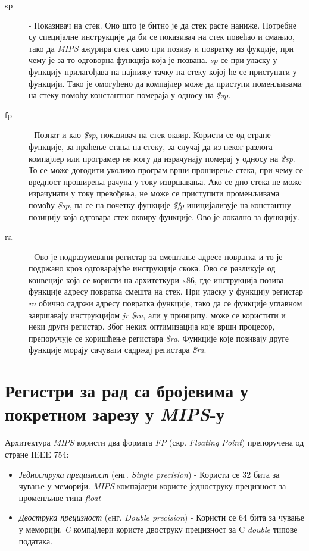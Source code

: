 \documentclass[12pt,oneside]{memoir}
\begin{document}
\begin{description}
  \item[sp] - Показивач на стек. Оно што је битно је да стек расте наниже. Потребне су специјалне инструкције да би се показивач на стек повећао и смањио, тако да \textit{MIPS} ажурира стек само при позиву и повратку из фукције, при чему је за то одговорна функција која је позвана. \textit{sp} се при уласку у функцију прилагођава на најнижу тачку на стеку којој ће се приступати у функцији. Тако је омогућено да компајлер може да приступи поменљивама на стеку помоћу константног помераја у односу на \textit{\$sp}.
  \item[fp] - Познат и као \textit{\$sp}, показивач на стек оквир. Користи се од стране функције, за праћење стања на стеку, за случај да из неког разлога компајлер или програмер не могу да израчунају померај у односу на \textit{\$sp}. То се може догодити уколико програм врши проширење стека, при чему се вредност проширења рачуна у току извршавања. Ако се дно стека не може израчунати у току превођења, не може се приступити променљивама помоћу \textit{\$sp}, па се на почетку функције \textit{\$fp} иницијализује на константну позицију која одговара стек оквиру функције. Ово је локално за функцију.
  \item[ra] - Ово је подразумевани регистар за смештање адресе повратка и то је подржано кроз одговарајуће инструкције скока. Ово се разликује од конвеције која се користи на архитеткури x86, где инструкција позива функције адресу повратка смешта на стек. При уласку у функцију регистар \textit{ra} обично садржи адресу повратка функције, тако да се функције углавном завршавају инструкцијом \textit{jr \$ra}, али у принципу, може се користити и неки други регистар. Због неких оптимизација које врши процесор, препоручује се коришћење регистара \textit{\$ra}. Функције које позивају друге функције морају сачувати садржај регистара \textit{\$ra}.
\end{description}


\section{Регистри за рад са бројевима у покретном зарезу у \textit{MIPS}-у}
\label{fp_registri}

Архитектура \textit{MIPS} користи два формата \textit{FP} (скр. \textit{Floating Point}) препоручена од стране IEEE 754:

\begin{itemize}
	\item \textit{Једнострука прецизност} (eнг. \textit{Single precision}) - Користи се 32 бита за чување у меморији. \textit{MIPS} компајлери користе једноструку прецизност за променљиве типа \textit{float}
	\item \textit{Двострука прецизност} (eнг. \textit{Double precision}) - Користи се 64 бита за чување у меморији. \textit{C} компајлери користе двоструку прецизност за C \textit{double} типове података.
\end{itemize}
\end{document}
